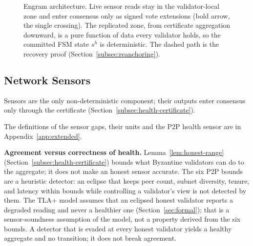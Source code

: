\begin{figure}[!t]
{}
\caption{Engram architecture. Live sensor reads stay in the validator-local
zone and enter consensus only as signed vote extensions (bold arrow, the single
crossing). The replicated zone, from certificate aggregation downward, is a
pure function of data every validator holds, so the committed FSM state
$s^{h}$ is deterministic. The dashed path is the recovery proof
(Section~\ref{subsec:reanchoring}).}
\label{fig:architecture}
\end{figure}

\subsection{Network Sensors}
\label{subsec:sensors}

Sensors are the only non-deterministic component; their outputs enter
consensus only through the certificate (Section~\ref{subsec:health-certificate}).

The definitions of the sensor gaps, their units and the P2P health sensor are in Appendix~\ref{app:extended}.

\textbf{Agreement versus correctness of health.} Lemma~\ref{lem:honest-range}
(Section~\ref{subsec:health-certificate}) bounds what
Byzantine validators can do to the aggregate; it does not make an honest
sensor accurate. The six P2P bounds are a heuristic detector: an eclipse that
keeps peer count, subnet diversity, tenure, and latency within bounds while
controlling a validator's view is not detected by them. The TLA+ model assumes
that an eclipsed honest validator reports a degraded reading and never a
healthier one
(Section~\ref{sec:formal}); that is a sensor-soundness assumption of the
model, not a property derived from the six bounds. A detector that is evaded
at every honest validator yields a healthy aggregate and no transition; it does
not break agreement.

